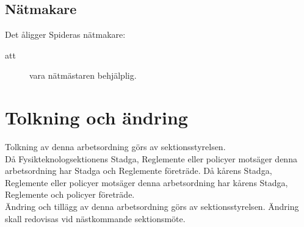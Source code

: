 \subsection{Nätmakare}
Det åligger Spideras nätmakare:
    \begin{description}
      \item[att] vara nätmästaren behjälplig.
    \end{description}
    
    
\section{Tolkning och ändring}
Tolkning av denna arbetsordning görs av sektionsstyrelsen.\\ Då Fysikteknologsektionens Stadga, Reglemente eller policyer motsäger denna arbetsordning har Stadga och Reglemente företräde. Då kårens Stadga, Reglemente eller policyer motsäger denna arbetsordning har kårens Stadga, Reglemente och policyer företräde.\\
Ändring och tillägg av denna arbetsordning görs av sektionsstyrelsen. Ändring skall redovisas vid nästkommande sektionsmöte. 
\newpage
